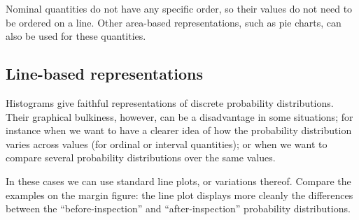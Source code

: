 \documentclass[
  a4paper,
  DIV=11,
  numbers=noendperiod,
  oneside]{scrreprt}
\begin{document}
Nominal quantities do not have any specific order, so their values do
not need to be ordered on a line. Other area-based representations, such
as pie charts, can also be used for these quantities.

\hypertarget{line-based-representations}{%
\subsection{Line-based
representations}\label{line-based-representations}}

Histograms give faithful representations of discrete probability
distributions. Their graphical bulkiness, however, can be a disadvantage
in some situations; for instance when we want to have a clearer idea of
how the probability distribution varies across values (for ordinal or
interval quantities); or when we want to compare several probability
distributions over the same values.

In these cases we can use standard line plots, or variations thereof.
Compare the examples on the margin figure: the line plot displays more
cleanly the differences between the ``before-inspection'' and
``after-inspection'' probability distributions.
\end{document}
